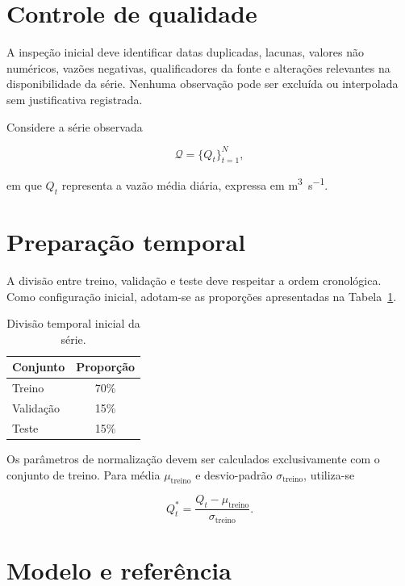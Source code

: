 \documentclass[12pt,a4paper]{article}
\begin{document}
\section{Controle de qualidade}

A inspeção inicial deve identificar datas duplicadas, lacunas, valores não
numéricos, vazões negativas, qualificadores da fonte e alterações relevantes na
disponibilidade da série. Nenhuma observação pode ser excluída ou interpolada
sem justificativa registrada.

Considere a série observada

\begin{equation}
    \mathcal{Q} = \{Q_t\}_{t=1}^{N},
\end{equation}

em que $Q_t$ representa a vazão média diária, expressa em
\si{\cubic\metre\per\second}.

\section{Preparação temporal}

A divisão entre treino, validação e teste deve respeitar a ordem cronológica.
Como configuração inicial, adotam-se as proporções apresentadas na
Tabela~\ref{tab:divisao}.

\begin{table}[ht]
    \centering
    \caption{Divisão temporal inicial da série.}
    \label{tab:divisao}
    \begin{tabular}{lc}
        \toprule
        \textbf{Conjunto} & \textbf{Proporção} \\
        \midrule
        Treino & 70\% \\
        Validação & 15\% \\
        Teste & 15\% \\
        \bottomrule
    \end{tabular}
\end{table}

Os parâmetros de normalização devem ser calculados exclusivamente com o
conjunto de treino. Para média $\mu_{\mathrm{treino}}$ e desvio-padrão
$\sigma_{\mathrm{treino}}$, utiliza-se

\begin{equation}
    Q_t^{*} = \frac{Q_t - \mu_{\mathrm{treino}}}
    {\sigma_{\mathrm{treino}}}.
\end{equation}

\section{Modelo e referência}
\end{document}
